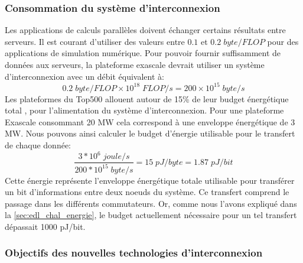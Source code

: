     
    \subsubsection{Consommation du système d'interconnexion} 
        
        Les applications de calculs parallèles doivent échanger certains résultats entre serveurs. Il est courant d'utiliser des valeurs entre $0.1$ et $0.2 \; byte/FLOP$ \cite{Bergman2015} pour des applications de simulation numérique. Pour pouvoir fournir suffisamment de données aux serveurs, la plateforme exascale devrait utiliser un système d'interconnexion avec un débit équivalent à:
        \begin{equation}
            0.2 \; byte/FLOP \times 10^{18} \; FLOP/s = 200 \times 10^{15} \; byte/s
        \end{equation}
        Les plateformes du Top500 allouent autour de 15\% de leur budget énergétique total \cite{bergman2008exascale}, pour l'alimentation du système d'interconnexion. Pour une plateforme Exascale consommant 20 MW cela correspond à une enveloppe énergétique de 3 MW. Nous pouvons ainsi calculer le budget d'énergie utilisable pour le transfert de chaque donnée:
        \begin{equation}
            \frac{3 * 10^6 \; joule/s}{200 * 10^{15} \; byte/s} = 15 \; pJ/byte = 1.87 \; pJ/bit
        \end{equation}
        Cette énergie représente l'enveloppe énergétique totale utilisable pour transférer un bit d'informations entre deux noeuds du système. Ce transfert comprend le passage dans les différents commutateurs. Or, comme nous l'avons expliqué dans la \autoref{sec:edl_chal_energie}, le budget actuellement nécessaire pour un tel transfert dépassait 1000 pJ/bit.
    
    
    \subsubsection{Objectifs des nouvelles technologies d'interconnexion} 
        
